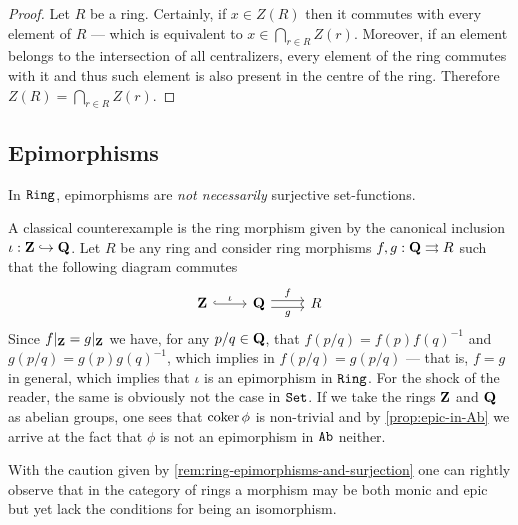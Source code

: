 %
\begin{proof}
    Let \(R\) be a ring. Certainly, if \(x \in Z(R)\) then it commutes with every
    element of \(R\) --- which is equivalent to \(x \in \bigcap_{r \in R}
    Z(r)\). Moreover, if an element belongs to the intersection of all centralizers,
    every element of the ring commutes with it and thus such element is also present
    in the centre of the ring. Therefore \(Z(R) = \bigcap_{r \in R} Z(r)\).
\end{proof}
%

\subsection{Epimorphisms}

%
\begin{remark}
    \label{rem:ring-epimorphisms-and-surjection}
    In \({\texttt{Ring}}\), epimorphisms are \emph{not necessarily} surjective set-functions.

    A classical counterexample is the ring morphism given by the canonical inclusion
    \(\iota: \mathbf{Z} \hookrightarrow \mathbf{Q}\). Let \(R\) be any ring and consider ring morphisms
    \(f, g: \mathbf{Q} \rightrightarrows R\) such that the following diagram commutes
    \[
        \begin{tikzcd}
            \Z \ar[r, hook, "\iota"]
            &\Q \ar[r, shift left, "f"] \ar[r, shift right, swap, "g"]
            &R
        \end{tikzcd}
    \]
    Since \(f|_{\mathbf{Z}} = g|_{\mathbf{Z}}\) we have, for any \(p/q \in \mathbf{Q}\), that
    \(f(p/q) = f(p) f(q)^{-1}\) and \(g(p/q) = g(p) g(q)^{-1}\), which implies in
    \(f(p/q) = g(p/q)\) --- that is, \(f = g\) in general, which implies that
    \(\iota\) is an epimorphism in \({\texttt{Ring}}\). For the shock of the reader, the same
    is obviously not the case in \({\texttt{Set}}\). If we take the rings \(\mathbf{Z}\) and \(\mathbf{Q}\) as
    abelian groups, one sees that \(\operatorname{coker} \phi\) is non-trivial and by
    \cref{prop:epic-in-Ab} we arrive at the fact that \(\phi\) is not an epimorphism
    in \({\texttt{Ab}}\) neither.
\end{remark}
%

%
\begin{remark}
    \label{rem:isomorphisms-in-ring}
    With the caution given by \cref{rem:ring-epimorphisms-and-surjection} one can
    rightly observe that in the category of rings a morphism may be both monic and
    epic but yet lack the conditions for being an isomorphism.
\end{remark}
%


